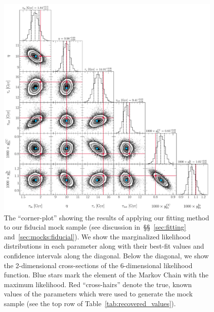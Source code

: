 \documentclass[ms.tex]{subfiles}
\begin{document}
\begin{figure}
\centering
\includegraphics[scale = 0.45]{fiducial_76k8.pdf}
\caption{
The ``corner-plot'' showing the results of applying our fitting method to our
fiducial mock sample (see discussion in~\S\S~\ref{sec:fitting}
and~\ref{sec:mocks:fiducial}).
We show the marginalized likelihood distributions in each parameter along with
their best-fit values and confidence intervals along the diagonal.
Below the diagonal, we show the 2-dimensional cross-sections of the
6-dimensional likelihood function.
Blue stars mark the element of the Markov Chain with the maximum likelihood.
Red ``cross-hairs'' denote the true, known values of the parameters which were
used to generate the mock sample (see the top row of
Table~\ref{tab:recovered_values}).
}
\label{fig:corner_fiducial}
\end{figure}
\end{document}
